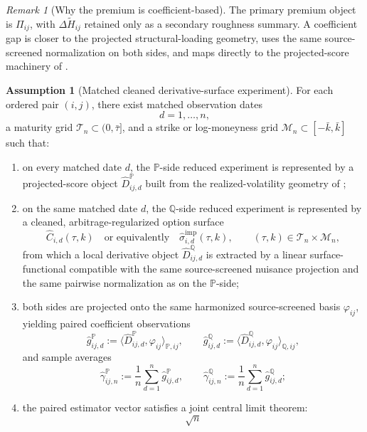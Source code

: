 \documentclass[11pt,a4paper]{amsart}
\theoremstyle{plain}
\theoremstyle{definition}
\newtheorem{assumption}[theorem]{Assumption}
\theoremstyle{remark}
\newtheorem{remark}[theorem]{Remark}
\newcommand{\PP}{\mathbb{P}}
\newcommand{\QQ}{\mathbb{Q}}
\begin{document}
\begin{remark}[Why the premium is coefficient-based]
The primary premium object is \(\Pi_{ij}\), with \(\Delta \widetilde H_{ij}\) retained only as a
secondary roughness summary.  A coefficient gap is closer to the projected structural-loading
geometry, uses the same source-screened normalization on both sides, and maps directly to the
projected-score machinery of \cite{vidal2026econometric}.
\end{remark}

\begin{assumption}[Matched cleaned derivative-surface experiment]\label{ass:premium}
For each ordered pair \((i,j)\), there exist matched observation dates
\[
        d=1,\dots,n,
\]
a maturity grid \(\mathcal T_n\subset(0,\bar\tau]\), and a strike or log-moneyness grid
\(\mathcal M_n\subset[-\bar k,\bar k]\) such that:
\begin{enumerate}[label=(\roman*)]
\item on every matched date \(d\), the \(\PP\)-side reduced experiment is represented by a
projected-score object \(\widehat D_{ij,d}^\PP\) built from the realized-volatility geometry of
\cite{vidal2026econometric};
\item on the same matched date \(d\), the \(\QQ\)-side reduced experiment is represented by a
cleaned, arbitrage-regularized option surface
\[
        \widehat C_{i,d}(\tau,k)
        \quad\text{or equivalently}\quad
        \widehat \sigma_{i,d}^{\mathrm{imp}}(\tau,k),
        \qquad
        (\tau,k)\in\mathcal T_n\times \mathcal M_n,
\]
from which a local derivative object \(\widehat D_{ij,d}^\QQ\) is extracted by a linear
surface-functional compatible with the same source-screened nuisance projection and the same
pairwise normalization as on the \(\PP\)-side;
\item both sides are projected onto the same harmonized source-screened basis \(\varphi_{ij}\),
yielding paired coefficient observations
\[
        \widehat g_{ij,d}^\PP
        :=
        \langle \widehat D_{ij,d}^\PP,\varphi_{ij}\rangle_{\PP,ij},
        \qquad
        \widehat g_{ij,d}^\QQ
        :=
        \langle \widehat D_{ij,d}^\QQ,\varphi_{ij}\rangle_{\QQ,ij},
\]
and sample averages
\[
        \widehat\gamma_{ij,n}^\PP
        :=
        \frac1n\sum_{d=1}^n \widehat g_{ij,d}^\PP,
        \qquad
        \widehat\gamma_{ij,n}^\QQ
        :=
        \frac1n\sum_{d=1}^n \widehat g_{ij,d}^\QQ;
\]
\item the paired estimator vector satisfies a joint central limit theorem:
\[
        \sqrt{n}
\]
\end{enumerate}
\end{assumption}
\end{document}
